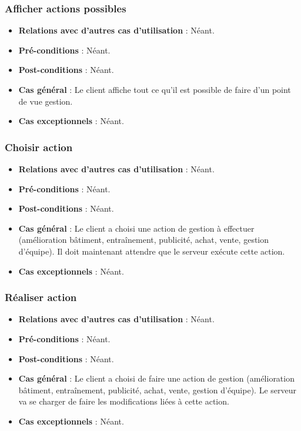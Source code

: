 \documentclass[a4paper,titlepage]{scrreprt}
\begin{document}
    \subsubsection{Afficher actions possibles}
      \begin{itemize}
        \item \textbf{Relations avec d'autres cas d'utilisation}  : Néant.
        \item \textbf{Pré-conditions} : Néant.
        \item \textbf{Post-conditions} : Néant.
        \item \textbf{Cas général} : Le client affiche tout ce qu’il est possible de faire d’un point de vue gestion.
        \item \textbf{Cas exceptionnels} : Néant.
      \end{itemize}
    \subsubsection{Choisir action}
      \begin{itemize}
        \item \textbf{Relations avec d'autres cas d'utilisation}  : Néant.
        \item \textbf{Pré-conditions} : Néant.
        \item \textbf{Post-conditions} : Néant.
        \item \textbf{Cas général} : Le client a choisi une action de gestion à effectuer (amélioration bâtiment, entraînement, publicité, achat, vente, gestion d’équipe). Il doit maintenant attendre que le serveur exécute cette action.
        \item \textbf{Cas exceptionnels} : Néant.
      \end{itemize}
    \subsubsection{Réaliser action}
      \begin{itemize}
        \item \textbf{Relations avec d'autres cas d'utilisation}  : Néant.
        \item \textbf{Pré-conditions} : Néant.
        \item \textbf{Post-conditions} : Néant.
        \item \textbf{Cas général} : Le client a choisi de faire une action de gestion (amélioration bâtiment, entraînement, publicité, achat, vente, gestion d’équipe). Le serveur va se charger de faire les modifications liées à cette action.
        \item \textbf{Cas exceptionnels} : Néant.
      \end{itemize}
\end{document}
